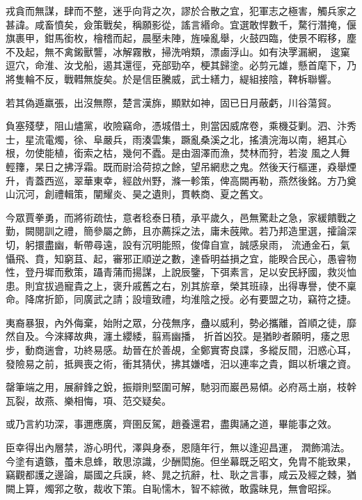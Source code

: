 \begin{pinyinscope}
 戎貪而無謀，肆而不整，迷乎向背之次，謬於合散之宜，犯軍志之極害，觸兵家之甚諱。咸畜憤矣，僉策戰矣，稱願影從，謠言緡命。宜選敢悍數千，騖行潛掩，偃旗裹甲，鉗馬銜枚，檜稽而起，晨壓未陣，旌噪亂舉，火鼓四臨，使景不暇移，塵不及起，無不禽鎩獸讋，冰解霧散，掃洗哨類，漂鹵浮山。如有決罦漏網，
 逡窠逗穴，命淮、汝戈船，遏其還徑，兗部勁卒，梗其歸塗。必剪元雄，懸首麾下，乃將隻輪不反，戰轊無旋矣。於是信臣騰威，武士繕力，緹組接陰，鞞柝聯響。



 若其偽遁羸張，出沒無際，楚言漢旆，顯默如神，固已日月蔽虧，川谷蕩貿。



 負塞殘孽，阻山燼黨，收險竊命，憑城借土，則當因威席卷，乘機芟剿。泗、汴秀士，星流電燭，徐、阜嚴兵，雨湊雲集，蹶亂桑溪之北，搖潰浣海以南，絕其心根，勿使能植，銜索之枯，幾何不蠹。是由涸澤而漁，焚林而狩，若浚
 風之人舞輕籜，杲日之拂浮霜。既而尉洽荷掠之餘，望吊網悲之鬼。然後天行樞運，猋舉煙升，青蓋西巡，翠華東幸，經啟州野，滌一軫策，俾高闕再勒，燕然後銘。方乃奠山沉河，創禮輯策，闡耀炎、昊之遺則，貫軼商、夏之舊文。



 今眾賈拳勇，而將術疏怯，意者稔泰日積，承平歲久，邑無驚赴之急，家緩饋戰之勤，闕閱訓之禮，簡參屬之飾，且亦薦採之法，庸未蔇歟。若乃邦造里選，攉論深切，躬擐盡幽，斬帶尋遠，設有沉明能照，俊偉自宣，誠感泉雨，
 流通金石，氣懾飛、賁，知窮苴、起，審邪正順逆之數，達昏明益損之宜，能睽合民心，愚睿物性，登丹墀而敷策，躡青蒲而揚謀，上說辰鑒，下弭素言，足以安民紓國，救災恤患。則宜拔過寵貴之上，褒升戚舊之右，別其旂章，榮其班祿，出得專譽，使不稟命。降席折節，同廣武之請；設壇致禮，均淮陰之授。必有要盟之功，竊符之捷。



 夷裔暴狠，內外侮棄，始附之眾，分茷無序，蠱以威利，勢必攜離，首順之徒，靡然自及。今淶繹故典，瀍土纓緌，翦焉幽播，
 折首凶狡。是猶眇者願明，痿之思步，動商遄會，功終易感。劫晉在於善覘，全鄭實寄良諜，多縱反間，汨惑心耳，發險易之前，抵興喪之術，衝其猜伏，拂其嫌嗜，汨以連率之貴，餌以析壤之資。



 罄筆端之用，展辭鋒之銳，振辯則堅圍可解，馳羽而巖邑易傾。必府鬲土崩，枝幹瓦裂，故燕、樂相悔，項、范交疑矣。



 或乃言約功深，事邇應廣，齊圉反駕，趙養還君，盡輿誦之道，畢能事之效。



 臣幸得出內層禁，游心明代，澤與身泰，恩隨年行，無以逢迎昌運，
 潤飾鴻法。今塗有遺鏃，蠆未息蜂，敢思涼識，少酬閎施。但坐幕既乏昭文，免胄不能致果，竊觀都護之邊論，屬國之兵謨，終、晁之抗辭，杜、耿之言事，咸云及經之棘，猶闕上算，燭郛之敬，裁收下策。自恥懦木，智不綜微，敢露昧見，無會昭採。




\end{pinyinscope}
